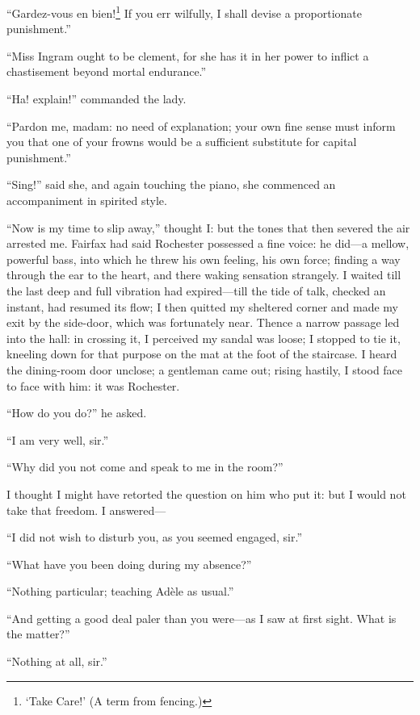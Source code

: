 \enquote{\foreignlanguage{french}{Gardez-vous en bien!}\footnote{\enquote{Take Care!} (A term from fencing.)} If you err wilfully, I shall devise a
proportionate punishment.}

\enquote{Miss Ingram ought to be clement, for she has it in her power to
inflict a chastisement beyond mortal endurance.}

\enquote{Ha! explain!} commanded the lady.

\enquote{Pardon me, madam: no need of explanation; your own fine sense
must inform you that one of your frowns would be a sufficient substitute
for capital punishment.}

\enquote{Sing!} said she, and again touching the piano, she commenced an
accompaniment in spirited style.

\enquote{Now is my time to slip away,} thought I: but the tones that
then severed the air arrested me. \Mrs{} Fairfax had said \Mr{} Rochester
possessed a fine voice: he did---a mellow, powerful bass, into which he
threw his own feeling, his own force; finding a way through the ear to
the heart, and there waking sensation strangely. I waited till the last
deep and full vibration had expired---till the tide of talk, checked an
instant, had resumed its flow; I then quitted my sheltered corner and
made my exit by the side-door, which was fortunately near. Thence a
narrow passage led into the hall: in crossing it, I perceived my sandal
was loose; I stopped to tie it, kneeling down for that purpose on the
mat at the foot of the staircase. I heard the dining-room door unclose;
a gentleman came out; rising hastily, I stood face to face with him: it
was \Mr{} Rochester.

\enquote{How do you do?} he asked.

\enquote{I am very well, sir.}

\enquote{Why did you not come and speak to me in the room?}

I thought I might have retorted the question on him who put it: but I
would not take that freedom. I answered---

\enquote{I did not wish to disturb you, as you seemed engaged, sir.}

\enquote{What have you been doing during my absence?}

\enquote{Nothing particular; teaching Adèle as usual.}

\enquote{And getting a good deal paler than you were---as I saw at first
sight. What is the matter?}

\enquote{Nothing at all, sir.}

